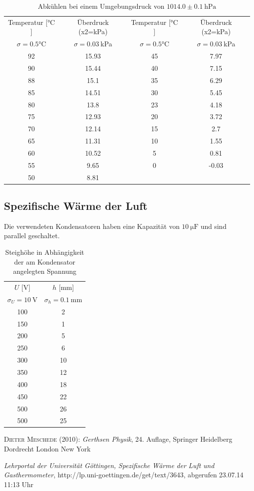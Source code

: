 \documentclass[12pt,a4paper,titlepage,headinclude,bibtotoc]{scrartcl}
\begin{document}
\begin{table}[!htb]
	\centering	
	\begin{tabular}{|c|c||c|c|}
	\hline
	Temperatur [$\si{\celsius}$]  & Überdruck (x2=kPa)&
	Temperatur [$\si{\celsius}$]  & Überdruck (x2=kPa)\\
	$\sigma=0.5\si{\celsius}$ & $\sigma=0.03~$kPa &
	$\sigma=0.5\si{\celsius}$ & $\sigma=0.03~$kPa \\
	\hline
	92	&	15.93	&	45	&	7.97	\\
	90	&	15.44	&	40	&	7.15	\\
	88	&	15.1	&	35	&	6.29	\\
	85	&	14.51	&	30	&	5.45	\\
	80	&	13.8	&	23	&	4.18	\\
	75	&	12.93	&	20	&	3.72	\\
	70	&	12.14	&	15	&	2.7	\\
	65	&	11.31	&	10	&	1.55	\\
	60	&	10.52	&	5	&	0.81	\\
	55	&	9.65	&	0	&	-0.03	\\
	50	&	8.81	&		&		\\
	\hline
	\end{tabular}
	\caption{Abkühlen  bei einem Umgebungsdruck von $1014.0\pm 0.1~\si{\hecto\pascal}$}
\end{table}

\subsection{Spezifische Wärme der Luft}
Die verwendeten Kondensatoren haben eine Kapazität von $10~\si{\micro\farad}$ und sind parallel geschaltet.


\begin{table}[!htb]
	\centering
	\begin{tabular}{|c|c|}
	\hline
	$U$ [V] & $h$ [mm]\\
	$\sigma_U=10~$V & $\sigma_h=0.1~$mm\\
	\hline
	100	&	2	\\
	150	&	1	\\
	200	&	5	\\
	250	&	6	\\
	300	&	10	\\
	350	&	12	\\
	400	&	18	\\
	450	&	22	\\
	500	&	26	\\
	500	&	25	\\	
	\hline
	\end{tabular}
	\caption{Steighöhe in Abhängigkeit der am Kondensator angelegten Spannung}
\end{table}

\begin{thebibliography}{100}

	\textsc{Dieter Meschede} (2010): \emph{Gerthsen Physik}, 24. Auflage, Springer Heidelberg
Dordrecht London New York

	\emph{Lehrportal der Universität Göttingen, Spezifische Wärme der Luft und Gasthermometer},
  http://lp.uni-goettingen.de/get/text/3643, abgerufen 23.07.14 11:13 Uhr

\end{thebibliography}
\end{document}
